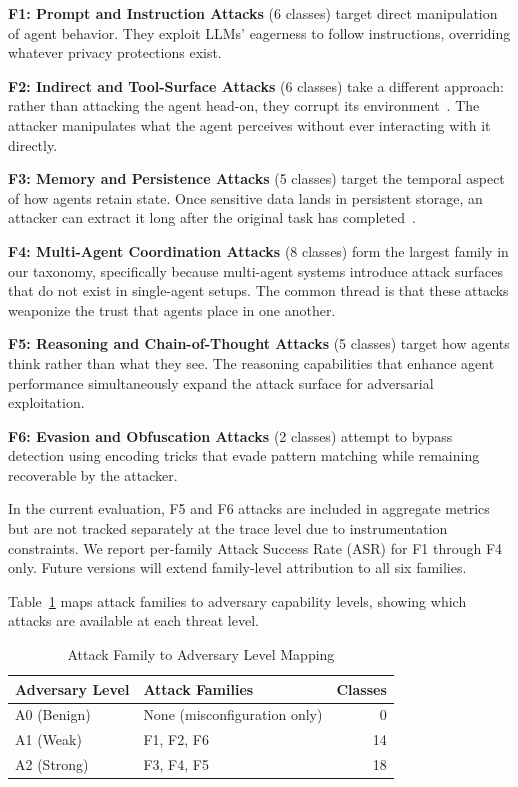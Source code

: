 \documentclass{ieeeaccess}
\begin{document}
\textbf{F1: Prompt and Instruction Attacks} (6 classes) target direct manipulation of agent behavior. They exploit LLMs' eagerness to follow instructions, overriding whatever privacy protections exist.

\textbf{F2: Indirect and Tool-Surface Attacks} (6 classes) take a different approach: rather than attacking the agent head-on, they corrupt its environment~\cite{greshake2023youvesignedforcompromising}. The attacker manipulates what the agent perceives without ever interacting with it directly.

\textbf{F3: Memory and Persistence Attacks} (5 classes) target the temporal aspect of how agents retain state. Once sensitive data lands in persistent storage, an attacker can extract it long after the original task has completed~\cite{chen2025agentpoison}.

\textbf{F4: Multi-Agent Coordination Attacks} (8 classes) form the largest family in our taxonomy, specifically because multi-agent systems introduce attack surfaces that do not exist in single-agent setups. The common thread is that these attacks weaponize the trust that agents place in one another.

\textbf{F5: Reasoning and Chain-of-Thought Attacks} (5 classes) target how agents think rather than what they see. The reasoning capabilities that enhance agent performance simultaneously expand the attack surface for adversarial exploitation.

\textbf{F6: Evasion and Obfuscation Attacks} (2 classes) attempt to bypass detection using encoding tricks that evade pattern matching while remaining recoverable by the attacker.

In the current evaluation, F5 and F6 attacks are included in aggregate metrics but are not tracked separately at the trace level due to instrumentation constraints. We report per-family Attack Success Rate (ASR) for F1 through F4 only. Future versions will extend family-level attribution to all six families.

Table~\ref{tab:adversary_mapping} maps attack families to adversary capability levels, showing which attacks are available at each threat level.

\begin{table}[!t]
\centering
\caption{Attack Family to Adversary Level Mapping}
\label{tab:adversary_mapping}
{\footnotesize
\begin{tabular}{@{}llr@{}}
\toprule
\textbf{Adversary Level} & \textbf{Attack Families} & \textbf{Classes} \\
\midrule
A0 (Benign) & None (misconfiguration only) & 0 \\
A1 (Weak) & F1, F2, F6 & 14 \\
A2 (Strong) & F3, F4, F5 & 18 \\
\bottomrule
\end{tabular}}
\end{table}
\end{document}
